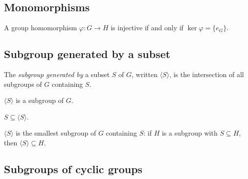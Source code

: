\subsection{Monomorphisms}
\label{subsec:groups:monomorphisms}

\begin{proposition}
  \label{prop:groups:injective-iff-trivial-kernel}
  A group homomorphism $\varphi : G \to H$ is injective if and only
  if $\ker\varphi = \{e_G\}$.
\end{proposition}

\subsection{Subgroup generated by a subset}
\label{subsec:groups:generated-subgroup}

\begin{definition}
  \label{def:groups:generated-subgroup}
  \leanok
  The \emph{subgroup generated by} a subset $S$ of $G$, written
  $\langle S \rangle$, is the intersection of all subgroups of $G$
  containing $S$.
\end{definition}

\begin{proposition}
  \label{prop:groups:generated-subgroup-is-subgroup}
  $\langle S \rangle$ is a subgroup of $G$.
\end{proposition}

\begin{proposition}
  \label{prop:groups:subset-generated-subgroup}
  $S \subseteq \langle S \rangle$.
\end{proposition}

\begin{proposition}
  \label{prop:groups:generated-subgroup-minimal}
  $\langle S \rangle$ is the smallest subgroup of $G$ containing $S$:
  if $H$ is a subgroup with $S \subseteq H$, then $\langle S \rangle
  \subseteq H$.
\end{proposition}

\subsection{Subgroups of cyclic groups}
\label{subsec:groups:subgroups-of-cyclic-groups}

